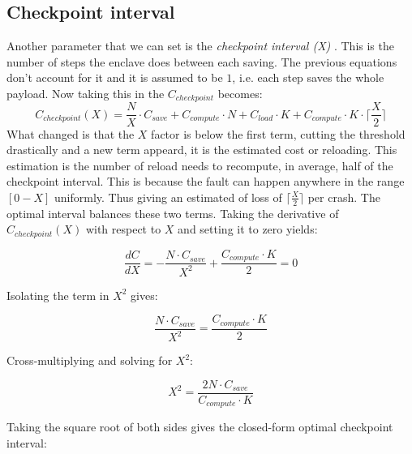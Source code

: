 \documentclass[11pt,a4paper]{report}
\begin{document}
\subsection{Checkpoint interval}
Another parameter that we can set is the \textit{checkpoint interval (X)} . This is the number of steps the enclave does between each saving.
The previous equations don't account for it and it is assumed to be $1$, i.e. each step saves the whole payload. 
Now taking this in the $C_{checkpoint}$ becomes:
\begin{equation}
C_{checkpoint}(X) = \frac{N}{X} \cdot C_{save} + C_{compute} \cdot N + C_{load} \cdot K + C_{compute} \cdot K \cdot \lceil \frac{X}{2} \rceil
\label{eq:checkpoint_interval_cost}
\end{equation}
What changed is that the $X$ factor is below the first term, cutting the threshold drastically and a new term appeard, it is the estimated cost or reloading.
This estimation is the number of reload needs to recompute, in average, half of the checkpoint interval. This is because the fault can happen anywhere in the range $[0-X]$ uniformly.
Thus giving an estimated of loss of $\lceil \frac{X}{2} \rceil$ per crash.
The optimal interval balances these two terms.
Taking the derivative of $C_{checkpoint}(X)$ with respect to $X$ and setting
it to zero yields:

\begin{equation*}
\frac{dC}{dX} = -\frac{N \cdot C_{save}}{X^2} + \frac{C_{compute} \cdot K}{2} = 0
\end{equation*}

Isolating the term in $X^2$ gives:

\begin{equation*}
\frac{N \cdot C_{save}}{X^2} = \frac{C_{compute} \cdot K}{2}
\end{equation*}

Cross-multiplying and solving for $X^2$:

\begin{equation*}
X^2 = \frac{2 N \cdot C_{save}}{C_{compute} \cdot K}
\end{equation*}

Taking the square root of both sides gives the closed-form optimal
checkpoint interval:
\end{document}

